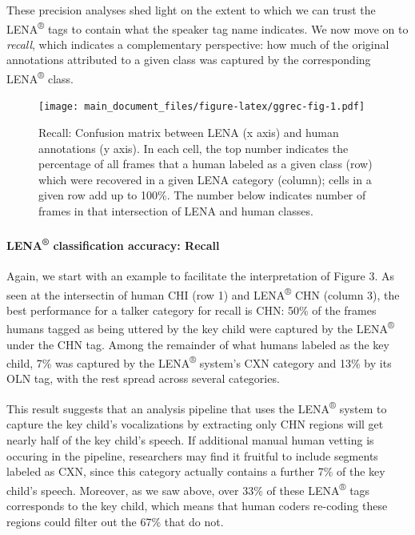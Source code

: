 \documentclass[english,table,man,floatsintext]{apa6}
\let\oldparagraph\paragraph
\renewcommand{\paragraph}[1]{\oldparagraph{#1}\mbox{}}
\begin{document}
These precision analyses shed light on the extent to which we can trust the LENA\textsuperscript{®} tags to contain what the speaker tag name indicates. We now move on to \emph{recall}, which indicates a complementary perspective: how much of the original annotations attributed to a given class was captured by the corresponding LENA\textsuperscript{®} class.

\begin{figure}
\centering
\texttt{[image: main\_document\_files/figure-latex/ggrec-fig-1.pdf]}
\caption{\label{fig:ggrec-fig}Recall: Confusion matrix between LENA (x axis) and human annotations (y axis). In each cell, the top number indicates the percentage of all frames that a human labeled as a given class (row) which were recovered in a given LENA category (column); cells in a given row add up to 100\%. The number below indicates number of frames in that intersection of LENA and human classes.}
\end{figure}

\hypertarget{lena-classification-accuracy-recall}{%
\paragraph{\texorpdfstring{LENA\textsuperscript{®} classification accuracy: Recall}{LENA® classification accuracy: Recall}}\label{lena-classification-accuracy-recall}}

Again, we start with an example to facilitate the interpretation of Figure 3. As seen at the intersectin of human CHI (row 1) and LENA\textsuperscript{®} CHN (column 3), the best performance for a talker category for recall is CHN: 50\% of the frames humans tagged as being uttered by the key child were captured by the LENA\textsuperscript{®} under the CHN tag. Among the remainder of what humans labeled as the key child, 7\% was captured by the LENA\textsuperscript{®} system's CXN category and 13\% by its OLN tag, with the rest spread across several categories.

This result suggests that an analysis pipeline that uses the LENA\textsuperscript{®} system to capture the key child's vocalizations by extracting only CHN regions will get nearly half of the key child's speech. If additional manual human vetting is occuring in the pipeline, researchers may find it fruitful to include segments labeled as CXN, since this category actually contains a further 7\% of the key child's speech. Moreover, as we saw above, over 33\% of these LENA\textsuperscript{®} tags corresponds to the key child, which means that human coders re-coding these regions could filter out the 67\% that do not.
\end{document}
